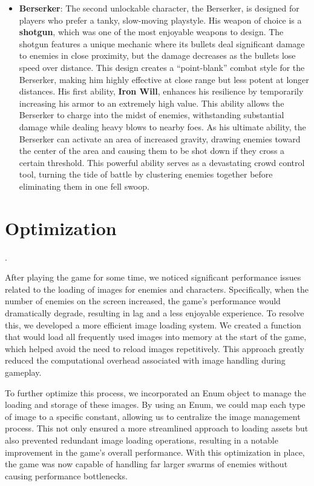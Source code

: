 \documentclass[a4paper,12pt]{article}
\begin{document}
\begin{itemize}
    \item \textbf{Berserker}: The second unlockable character, the Berserker, is designed for players who prefer a tanky, slow-moving playstyle. His weapon of choice is a \textbf{shotgun}, which was one of the most enjoyable weapons to design. The shotgun features a unique mechanic where its bullets deal significant damage to enemies in close proximity, but the damage decreases as the bullets lose speed over distance. This design creates a “point-blank” combat style for the Berserker, making him highly effective at close range but less potent at longer distances. His first ability, \textbf{Iron Will}, enhances his resilience by temporarily increasing his armor to an extremely high value. This ability allows the Berserker to charge into the midst of enemies, withstanding substantial damage while dealing heavy blows to nearby foes. As his ultimate ability, the Berserker can activate an area of increased gravity, drawing enemies toward the center of the area and causing them to be shot down if they cross a certain threshold. This powerful ability serves as a devastating crowd control tool, turning the tide of battle by clustering enemies together before eliminating them in one fell swoop.
\end{itemize}

\section*{Optimization}
.

After playing the game for some time, we noticed significant performance issues related to the loading of images for enemies and characters. Specifically, when the number of enemies on the screen increased, the game’s performance would dramatically degrade, resulting in lag and a less enjoyable experience. To resolve this, we developed a more efficient image loading system. We created a function that would load all frequently used images into memory at the start of the game, which helped avoid the need to reload images repetitively. This approach greatly reduced the computational overhead associated with image handling during gameplay.

To further optimize this process, we incorporated an Enum object to manage the loading and storage of these images. By using an Enum, we could map each type of image to a specific constant, allowing us to centralize the image management process. This not only ensured a more streamlined approach to loading assets but also prevented redundant image loading operations, resulting in a notable improvement in the game’s overall performance. With this optimization in place, the game was now capable of handling far larger swarms of enemies without causing performance bottlenecks.
\end{document}
